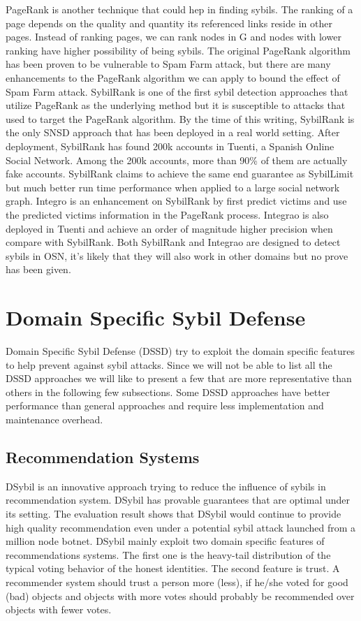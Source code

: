 \documentclass[conference]{IEEEtran}
\begin{document}
PageRank is another technique that could hep in finding sybils. The ranking of a page depends on the quality and quantity its referenced links reside in other pages. Instead of ranking pages, we can rank nodes in G and nodes with lower ranking have higher possibility of being sybils. The original PageRank algorithm has been proven to be vulnerable to Spam Farm attack, but there are many enhancements to the PageRank algorithm we can apply to bound the effect of Spam Farm attack. SybilRank\cite{cao12sybilrank} is one of the first sybil detection approaches that utilize PageRank as the underlying method but it is susceptible to attacks that used to target the PageRank algorithm. By the time of this writing, SybilRank is the only SNSD approach that has been deployed in a real world setting. After deployment, SybilRank has found 200k accounts in Tuenti, a Spanish Online Social Network. Among the 200k accounts, more than 90\% of them are actually fake accounts. SybilRank claims to achieve the same end guarantee as SybilLimit but much better run time performance when applied to a large social network graph. Integro \cite{boshmaf15integro} is an enhancement on SybilRank by first predict victims and use the predicted victims information in the PageRank process. Integrao is also deployed in Tuenti and achieve an order of magnitude higher precision when compare with SybilRank. Both SybilRank and Integrao  are designed to detect sybils in OSN, it's likely that they will also work in other domains but no prove has been given.

\section{Domain Specific Sybil Defense}
Domain Specific Sybil Defense (DSSD) try to exploit the domain specific features to help prevent against sybil attacks. Since we will not be able to list all the DSSD approaches we will like to present a few that are more representative than others in the following few subsections. Some DSSD approaches have better performance than general approaches and require less implementation and maintenance overhead.

\subsection{Recommendation Systems}
DSybil\cite{yu09dsybil} is an innovative approach trying to reduce the influence of sybils in recommendation system. DSybil has provable guarantees that are optimal under its setting. The evaluation result shows that DSybil would continue to provide high quality recommendation even under a potential sybil attack launched from a million node botnet. DSybil mainly exploit two domain specific features of recommendations systems. The first one is the  heavy-tail distribution of the typical voting behavior of the honest identities. The second feature is trust. A recommender system should trust a person more (less), if he/she voted for good (bad) objects and objects with more votes should probably be recommended over objects with fewer votes.
\end{document}
